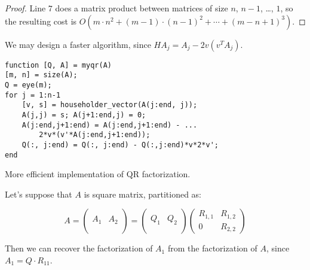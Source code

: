 \documentclass[computational_mathematics.tex]{subfiles}
\begin{document}
\begin{proof}
  Line $7$ does a matrix product between matrices of size $n$, $n-1$, \ldots, $1$, so the resulting cost is  $O(m \cdot n^{2} + {(m-1) \cdot (n-1)}^{2} + \cdots + {(m - n + 1)}^{3})$.

\end{proof}

We may design a faster algorithm, since $HA_j = A_j - 2v(v^T A_j)$.
\begin{center}
\begin{minipage}{.9\linewidth}
\begin{algorithm}[H]
\begin{verbatim}
function [Q, A] = myqr(A)
[m, n] = size(A);
Q = eye(m);
for j = 1:n-1
    [v, s] = householder_vector(A(j:end, j));
    A(j,j) = s; A(j+1:end,j) = 0;
    A(j:end,j+1:end) = A(j:end,j+1:end) - ...
        2*v*(v'*A(j:end,j+1:end));
    Q(:, j:end) = Q(:, j:end) - Q(:,j:end)*v*2*v';
end
\end{verbatim}
  \label{alg:26ottQR2}
\caption{More efficient implementation of QR factorization.}
\end{algorithm}
\end{minipage}
\end{center}

Let's suppose that $A$ is square matrix, partitioned as:

\[A = \begin{pmatrix}
    &\\
  A_{1} & A_{2}\\
  &\\
\end{pmatrix} =
 \begin{pmatrix}
   &\\
   Q_{1} & Q_{2}\\
   &\\
\end{pmatrix}
\begin{pmatrix}
  R_{1, 1} & R_{1,2}\\
  0 & R_{2,2}
  \end{pmatrix}
\]

Then we can recover the factorization of $A_{1}$ from the factorization of $A$, since $A_{1} = Q \cdot R_{11}$.
\end{document}
